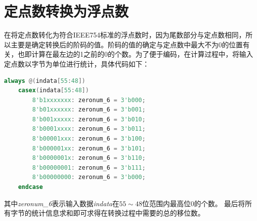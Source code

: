 \documentclass[a4paper,12pt]{report}
\begin{document}
\section{定点数转换为浮点数}
在将定点数转化为符合IEEE754标准的浮点数时，因为尾数部分与定点数相同，所以主要是确定转换后的阶码的值。阶码的值的确定与定点数中最大不为0的位置有关，也即计算在最左边的1之前的0的个数。为了便于编码，在计算过程中，将输入定点数以字节为单位进行统计，具体代码如下：
{
\footnotesize
\begin{lstlisting}[language=Verilog]
always @(indata[55:48])
	casex(indata[55:48])
	    8'b1xxxxxxx: zeronum_6 = 3'b000;
	    8'b01xxxxxx: zeronum_6 = 3'b001;
	    8'b001xxxxx: zeronum_6 = 3'b010;
	    8'b0001xxxx: zeronum_6 = 3'b011;
	    8'b00001xxx: zeronum_6 = 3'b100;
	    8'b000001xx: zeronum_6 = 3'b101;
	    8'b0000001x: zeronum_6 = 3'b110;
	    8'b00000001: zeronum_6 = 3'b111;
	    8'b00000000: zeronum_6 = 3'b000;
	endcase
\end{lstlisting}
}
其中\textit{zeronum\_6}表示输入数据\textit{indata}在$55 \sim 48$位范围内最高位0的个数。
最后将所有字节的统计信息求和即可求得在转换过程中需要的总的移位数。
\end{document}
